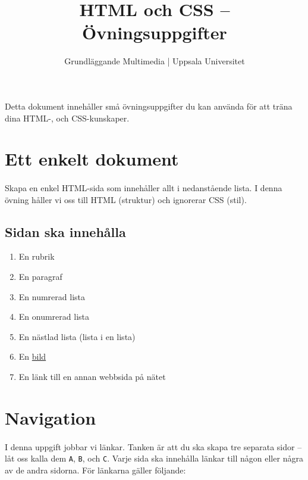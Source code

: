 \documentclass{article}
\begin{document}
  \title{ HTML och CSS -- Övningsuppgifter }
  \author{ Grundläggande Multimedia | Uppsala Universitet }
  \date{}
  \maketitle

  \paragraph{}
  Detta dokument innehåller små övningsuppgifter du kan använda för att träna dina HTML-, och CSS-kunskaper.


  \newpage
  \section{ Ett enkelt dokument }
    \paragraph{}
    Skapa en enkel HTML-sida som innehåller allt i nedanstående lista. I denna övning håller vi oss till HTML (struktur) och ignorerar CSS (stil).

    \subsection*{Sidan ska innehålla}
      \begin{enumerate}
        \item En rubrik
        \item En paragraf
        \item En numrerad lista
        \item En onumrerad lista
        \item En nästlad lista (lista i en lista)
        \item En \href{https://www.google.se/search?q=kitten+meme&tbm=isch}{bild}
        \item En länk till en annan webbsida på nätet
      \end{enumerate}


  \newpage
  \section{ Navigation }
    \paragraph{}
    I denna uppgift jobbar vi länkar. Tanken är att du ska skapa tre separata sidor -- låt oss kalla dem \texttt{A}, \texttt{B}, och \texttt{C}. Varje sida ska innehålla länkar till någon eller några av de andra sidorna. För länkarna gäller följande:
\end{document}
